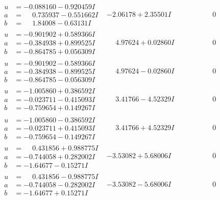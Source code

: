 \documentclass[1p]{elsarticle_modified}
\theoremstyle{definition}
\begin{document}
$$\begin{array}{c|c|c}
\begin{aligned}
u &= -0.088160 - 0.920459 I \\
a &= \phantom{-}0.735937 - 0.551662 I \\
b &= \phantom{-}1.84008 - 0.63131 I\end{aligned}
 & -2.06178 + 2.35501 I & \phantom{-0.000000 } 0 \\ \hline\begin{aligned}
u &= -0.901902 + 0.589366 I \\
a &= -0.384938 + 0.899525 I \\
b &= -0.864785 + 0.056309 I\end{aligned}
 & \phantom{-}4.97624 + 0.02860 I & \phantom{-0.000000 } 0 \\ \hline\begin{aligned}
u &= -0.901902 - 0.589366 I \\
a &= -0.384938 - 0.899525 I \\
b &= -0.864785 - 0.056309 I\end{aligned}
 & \phantom{-}4.97624 - 0.02860 I & \phantom{-0.000000 } 0 \\ \hline\begin{aligned}
u &= -1.005860 + 0.386592 I \\
a &= -0.023711 - 0.415093 I \\
b &= -0.759654 + 0.149267 I\end{aligned}
 & \phantom{-}3.41766 - 4.52329 I & \phantom{-0.000000 } 0 \\ \hline\begin{aligned}
u &= -1.005860 - 0.386592 I \\
a &= -0.023711 + 0.415093 I \\
b &= -0.759654 - 0.149267 I\end{aligned}
 & \phantom{-}3.41766 + 4.52329 I & \phantom{-0.000000 } 0 \\ \hline\begin{aligned}
u &= \phantom{-}0.431856 + 0.988775 I \\
a &= -0.744058 + 0.282002 I \\
b &= -1.64677 - 0.15271 I\end{aligned}
 & -3.53082 + 5.68006 I & \phantom{-0.000000 } 0 \\ \hline\begin{aligned}
u &= \phantom{-}0.431856 - 0.988775 I \\
a &= -0.744058 - 0.282002 I \\
b &= -1.64677 + 0.15271 I\end{aligned}
 & -3.53082 - 5.68006 I & \phantom{-0.000000 } 0\\

\end{array}$$
\end{document}
